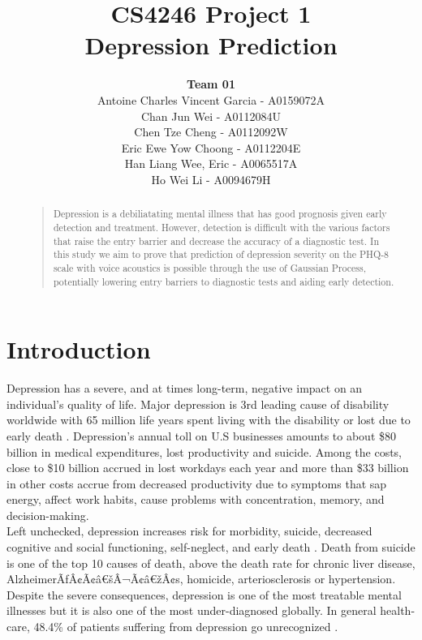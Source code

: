 \documentclass{article}
\title{
	CS4246 Project 1\\ Depression Prediction
}
\author{
	{\bf Team 01} \\
	Antoine Charles Vincent Garcia - A0159072A\\
	Chan Jun Wei - A0112084U\\
	Chen Tze Cheng - A0112092W\\
	Eric Ewe Yow Choong - A0112204E\\
	Han Liang Wee, Eric - A0065517A\\
	Ho Wei Li - A0094679H\\
}
\begin{document}
 	\maketitle

	\begin{abstract}
	\begin{quote}
	Depression is a debiliatating mental illness that has good prognosis given early detection and treatment. However, detection is difficult with the various factors that raise the entry barrier and decrease the accuracy of a diagnostic test. In this study we aim to prove that prediction of depression severity on the PHQ-8 scale with voice acoustics is possible through the use of Gaussian Process, potentially lowering entry barriers to diagnostic tests and aiding early detection.\\
	\end{quote}
	\end{abstract}
	
	\section{Introduction}
	Depression has a severe, and at times long-term, negative impact on an individual's quality of life. 
	Major depression is 3rd leading cause of disability worldwide with 65 million life years spent living with the disability or lost due to early death \cite{who2004}.
	Depression's annual toll on U.S businesses amounts to about \$80 billion in medical expenditures, lost productivity and suicide. Among the costs, close to \$10 billion accrued in lost workdays each year and more than \$33 billion in other costs accrue from decreased productivity due to symptoms that sap energy, affect work habits, cause problems with concentration, memory, and decision-making. \cite{tjcp2015}\\

	Left unchecked, depression increases risk for morbidity, suicide, decreased cognitive and social functioning, self-neglect, and early death \cite{arcp2009}. Death from suicide is one of the top 10 causes of death, above the death rate for chronic liver disease, AlzheimerÃƒÂ¢Ã¢â€šÂ¬Ã¢â€žÂ¢s, homicide, arteriosclerosis or hypertension. \cite{nvsr2016}\\
	
	Despite the severe consequences, depression is one of the most treatable mental illnesses but it is also one of the most under-diagnosed globally. In general health-care, 48.4\% of 		patients suffering from depression go unrecognized \cite{jama2003}.\\
\end{document}
